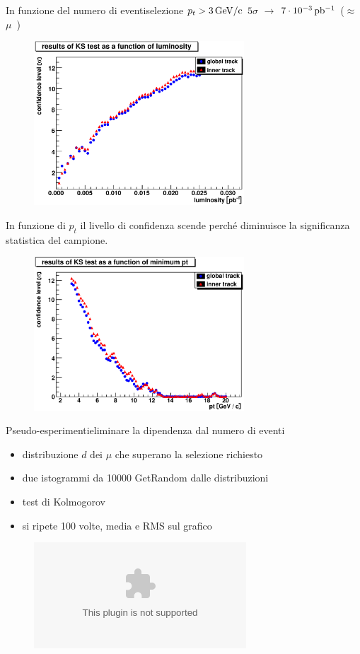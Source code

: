 \documentclass[italian]{beamer}
\begin{document}
\begin{frame}
    {In funzione del numero di eventi}{selezione $p_t > \unit[3]{GeV/c}$}
    $5\sigma$ $\to$ $\unit[7\cdot 10^{-3}]{pb^{-1}}$ ($\approx$
    \unit[250 000]{$\mu$}) 
\begin{figure}[h]
    \includegraphics[width=0.7\textwidth]{crea_istogrammi/lum_1.eps}
\end{figure}
\end{frame}

\begin{frame}{In funzione di $p_t$}
    il livello di confidenza scende perch\'e diminuisce la significanza
    statistica del campione.
\begin{figure}[h]
    \includegraphics[width=0.7\textwidth]{crea_istogrammi/pt_1.eps}
\end{figure}
\end{frame}

\begin{frame}{Pseudo-esperimenti}{eliminare la dipendenza dal numero di
    eventi}
    \begin{itemize}
        \item<1-> distribuzione $d$ dei $\mu$ che superano la selezione richiesto
        \item<2-> due istogrammi da 10000 GetRandom dalle distribuzioni
        \item<3-> test di Kolmogorov
        \item<3-> si ripete 100 volte, media e RMS sul grafico 
    \end{itemize}
\begin{figure}[h]
    \includegraphics<4->[height=0.6\textheight]{crea_istogrammi/pseudo_pt_1.eps}
\end{figure}
\end{frame}
\end{document}
